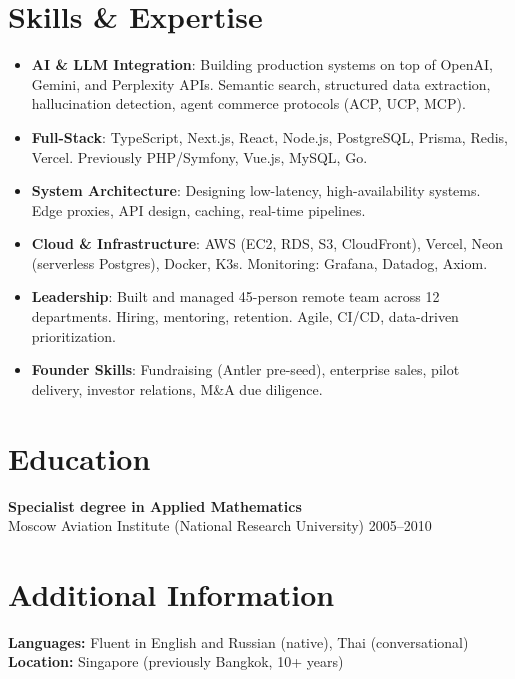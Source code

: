 \documentclass[11pt,a4paper]{article}
\begin{document}
\section*{Skills \& Expertise}
\begin{itemize}
    \item \textbf{AI \& LLM Integration}: Building production systems on top of OpenAI, Gemini, and Perplexity APIs. Semantic search, structured data extraction, hallucination detection, agent commerce protocols (ACP, UCP, MCP).
    \item \textbf{Full-Stack}: TypeScript, Next.js, React, Node.js, PostgreSQL, Prisma, Redis, Vercel. Previously PHP/Symfony, Vue.js, MySQL, Go.
    \item \textbf{System Architecture}: Designing low-latency, high-availability systems. Edge proxies, API design, caching, real-time pipelines.
    \item \textbf{Cloud \& Infrastructure}: AWS (EC2, RDS, S3, CloudFront), Vercel, Neon (serverless Postgres), Docker, K3s. Monitoring: Grafana, Datadog, Axiom.
    \item \textbf{Leadership}: Built and managed 45-person remote team across 12 departments. Hiring, mentoring, retention. Agile, CI/CD, data-driven prioritization.
    \item \textbf{Founder Skills}: Fundraising (Antler pre-seed), enterprise sales, pilot delivery, investor relations, M\&A due diligence.
\end{itemize}

\section*{Education}
\textbf{Specialist degree in Applied Mathematics} \\
Moscow Aviation Institute (National Research University) \hfill 2005--2010

\section*{Additional Information}
\textbf{Languages:} Fluent in English and Russian (native), Thai (conversational) \\
\textbf{Location:} Singapore (previously Bangkok, 10+ years)
\end{document}
